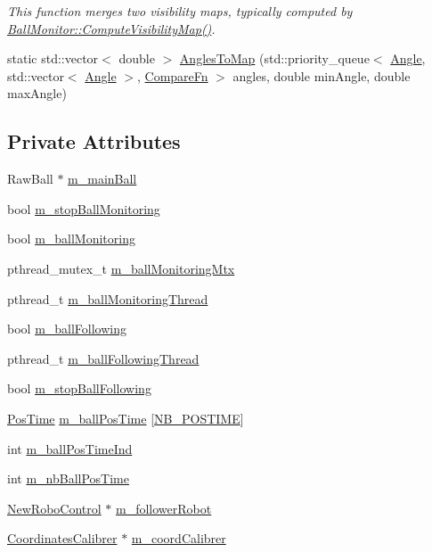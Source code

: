 \begin{DoxyCompactItemize}
\begin{DoxyCompactList}\small\item\em This function merges two visibility maps, typically computed by \hyperlink{classBallMonitor_a0d2ef73ba2b0573021c800c311e08245}{BallMonitor::ComputeVisibilityMap()}. \item\end{DoxyCompactList}\item 
static std::vector$<$ double $>$ \hyperlink{classBallMonitor_a8f3198b6b4ef8eb52c0ff04afd33cc8f}{AnglesToMap} (std::priority\_\-queue$<$ \hyperlink{structBallMonitor_1_1Angle}{Angle}, std::vector$<$ \hyperlink{structBallMonitor_1_1Angle}{Angle} $>$, \hyperlink{classBallMonitor_a5ad781c99d5b43bee7c838de9da75527}{CompareFn} $>$ angles, double minAngle, double maxAngle)
\end{DoxyCompactItemize}
\subsection*{Private Attributes}
\begin{DoxyCompactItemize}
\item 
RawBall $\ast$ \hyperlink{classBallMonitor_a4bd064999cb8ee1a286c8dd7ac11ce05}{m\_\-mainBall}
\item 
bool \hyperlink{classBallMonitor_a2486fa4296de6308930dc3864e05b61a}{m\_\-stopBallMonitoring}
\item 
bool \hyperlink{classBallMonitor_ac991e138d7e4ae238d2a68365c1caa68}{m\_\-ballMonitoring}
\item 
pthread\_\-mutex\_\-t \hyperlink{classBallMonitor_a5a9a84961419fefc7131d449bab07b0f}{m\_\-ballMonitoringMtx}
\item 
pthread\_\-t \hyperlink{classBallMonitor_a97247e5882aa1012dca3a84ba1350ffe}{m\_\-ballMonitoringThread}
\item 
bool \hyperlink{classBallMonitor_ada441cfbcbac3335a118348945e8b6c7}{m\_\-ballFollowing}
\item 
pthread\_\-t \hyperlink{classBallMonitor_af2b98e5dca99d4d2efc01330d84400d6}{m\_\-ballFollowingThread}
\item 
bool \hyperlink{classBallMonitor_a306a59cfa638a9e4a4c8b6881b5e7f91}{m\_\-stopBallFollowing}
\item 
\hyperlink{structBallMonitor_1_1PosTime}{PosTime} \hyperlink{classBallMonitor_ad20f7e0f913357a70ad2d5113bb7cb5b}{m\_\-ballPosTime} \mbox{[}\hyperlink{classBallMonitor_a6603291a8d6c6a2de7b378ece54d5e2b}{NB\_\-POSTIME}\mbox{]}
\item 
int \hyperlink{classBallMonitor_a2f93064edafac9ef59555ecc8d860e0f}{m\_\-ballPosTimeInd}
\item 
int \hyperlink{classBallMonitor_a80d4362976840374c4e5c207e6a38c86}{m\_\-nbBallPosTime}
\item 
\hyperlink{classNewRoboControl}{NewRoboControl} $\ast$ \hyperlink{classBallMonitor_a3411a0f9095e0d0e948a48b015ff1598}{m\_\-followerRobot}
\item 
\hyperlink{classCoordinatesCalibrer}{CoordinatesCalibrer} $\ast$ \hyperlink{classBallMonitor_addde606e4f6cd92dc43efd3342ce5f60}{m\_\-coordCalibrer}
\end{DoxyCompactItemize}


